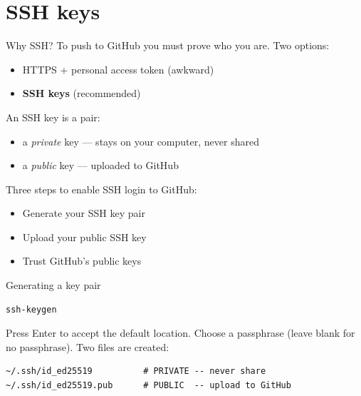 \documentclass[11pt]{beamer}
\begin{document}

\section{SSH keys}

\begin{frame}{Why SSH?}
  To push to GitHub you must prove who you are.
  \vfill
  Two options:
  \begin{itemize}
    \item HTTPS + personal access token (awkward)
    \item \textbf{SSH keys} (recommended)
  \end{itemize}
  \vfill
  An SSH key is a pair:
  \begin{itemize}
    \item a \emph{private} key --- stays on your computer, never shared
    \item a \emph{public} key --- uploaded to GitHub
    \end{itemize}
    \vfill
    Three steps to enable SSH login to GitHub:
    \begin{itemize}
    \item Generate your SSH key pair
    \item Upload your public SSH key
    \item Trust GitHub's public keys
    \end{itemize}
\end{frame}

\begin{frame}[fragile]{Generating a key pair}
\begin{lstlisting}
ssh-keygen
\end{lstlisting}
  Press Enter to accept the default location.
  Choose a passphrase (leave blank for no passphrase).
  \vfill
  Two files are created:
\begin{lstlisting}
~/.ssh/id_ed25519          # PRIVATE -- never share
~/.ssh/id_ed25519.pub      # PUBLIC  -- upload to GitHub
\end{lstlisting}
\end{frame}
\end{document}

